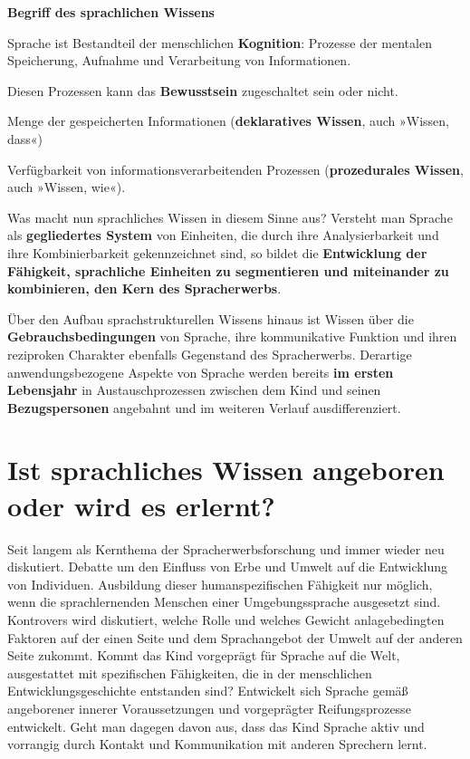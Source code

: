 \documentclass[
  letterpaper,
]{scrbook}
\begin{document}
\textbf{Begriff des sprachlichen Wissens}

Sprache ist Bestandteil der menschlichen \textbf{Kognition}: Prozesse
der mentalen Speicherung, Aufnahme und Verarbeitung von Informationen.

Diesen Prozessen kann das \textbf{Bewusstsein} zugeschaltet sein oder
nicht.

Menge der gespeicherten Informationen (\textbf{deklaratives Wissen},
auch »Wissen, dass«)

Verfügbarkeit von informationsverarbeitenden Prozessen
(\textbf{prozedurales Wissen}, auch »Wissen, wie«).

Was macht nun sprachliches Wissen in diesem Sinne aus? Versteht man
Sprache als \textbf{gegliedertes System} von Einheiten, die durch ihre
Analysierbarkeit und ihre Kombinierbarkeit gekennzeichnet sind, so
bildet die \textbf{Entwicklung der Fähigkeit, sprachliche Einheiten zu
segmentieren und miteinander zu kombinieren, den Kern des
Spracherwerbs}.

Über den Aufbau sprachstrukturellen Wissens hinaus ist Wissen über die
\textbf{Gebrauchsbedingungen} von Sprache, ihre kommunikative Funktion
und ihren reziproken Charakter ebenfalls Gegenstand des Spracherwerbs.
Derartige anwendungsbezogene Aspekte von Sprache werden bereits
\textbf{im ersten Lebensjahr} in Austauschprozessen zwischen dem Kind
und seinen \textbf{Bezugspersonen} angebahnt und im weiteren Verlauf
ausdifferenziert.

\hypertarget{ist-sprachliches-wissen-angeboren-oder-wird-es-erlernt}{%
\section{Ist sprachliches Wissen angeboren oder wird es
erlernt?}\label{ist-sprachliches-wissen-angeboren-oder-wird-es-erlernt}}

Seit langem als Kernthema der Spracherwerbsforschung und immer wieder
neu diskutiert. Debatte um den Einfluss von Erbe und Umwelt auf die
Entwicklung von Individuen. Ausbildung dieser humanspezifischen
Fähigkeit nur möglich, wenn die sprachlernenden Menschen einer
Umgebungssprache ausgesetzt sind. Kontrovers wird diskutiert, welche
Rolle und welches Gewicht anlagebedingten Faktoren auf der einen Seite
und dem Sprachangebot der Umwelt auf der anderen Seite zukommt. Kommt
das Kind vorgeprägt für Sprache auf die Welt, ausgestattet mit
spezifischen Fähigkeiten, die in der menschlichen Entwicklungsgeschichte
entstanden sind? Entwickelt sich Sprache gemäß angeborener innerer
Voraussetzungen und vorgeprägter Reifungsprozesse entwickelt. Geht man
dagegen davon aus, dass das Kind Sprache aktiv und vorrangig durch
Kontakt und Kommunikation mit anderen Sprechern lernt.  
\end{document}
